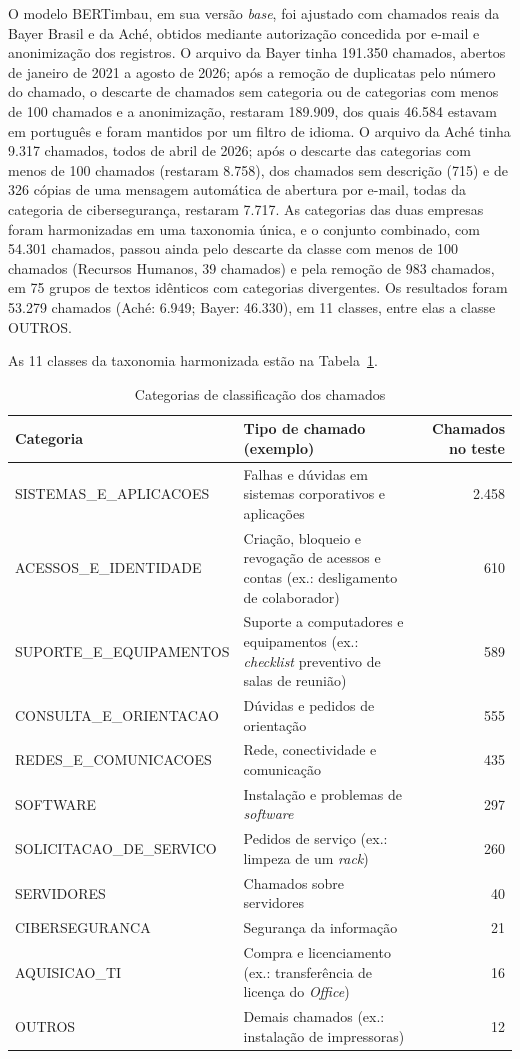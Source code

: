 \documentclass[
    12pt,                %
    openright,           %
    oneside,             %
    a4paper,             %
    english,             %
    brazil               %
]{abntex2}
\let\legendoriginal\legend
\renewcommand{\legend}[1]{\legendoriginal{\small #1}}
\begin{document}
O modelo BERTimbau, em sua versão \textit{base}, foi ajustado com chamados reais da Bayer Brasil e da Aché, obtidos mediante autorização concedida por e-mail e anonimização dos registros. O arquivo da Bayer tinha 191.350 chamados, abertos de janeiro de 2021 a agosto de 2026; após a remoção de duplicatas pelo número do chamado, o descarte de chamados sem categoria ou de categorias com menos de 100 chamados e a anonimização, restaram 189.909, dos quais 46.584 estavam em português e foram mantidos por um filtro de idioma. O arquivo da Aché tinha 9.317 chamados, todos de abril de 2026; após o descarte das categorias com menos de 100 chamados (restaram 8.758), dos chamados sem descrição (715) e de 326 cópias de uma mensagem automática de abertura por e-mail, todas da categoria de cibersegurança, restaram 7.717. As categorias das duas empresas foram harmonizadas em uma taxonomia única, e o conjunto combinado, com 54.301 chamados, passou ainda pelo descarte da classe com menos de 100 chamados (Recursos Humanos, 39 chamados) e pela remoção de 983 chamados, em 75 grupos de textos idênticos com categorias divergentes. Os resultados foram 53.279 chamados (Aché: 6.949; Bayer: 46.330), em 11 classes, entre elas a classe OUTROS.

As 11 classes da taxonomia harmonizada estão na Tabela~\ref{tab:categorias}.

\begin{table}[htb]
  \centering
  \caption{Categorias de classificação dos chamados}
  \label{tab:categorias}
  \footnotesize
  \setlength{\tabcolsep}{4pt}
  \begin{tabular}{p{5.5cm}p{6.2cm}r}
    \toprule
    Categoria & Tipo de chamado (exemplo) & Chamados no teste \\
    \midrule
    SISTEMAS\_E\_APLICACOES & Falhas e dúvidas em sistemas corporativos e aplicações & 2.458 \\
    ACESSOS\_E\_IDENTIDADE & Criação, bloqueio e revogação de acessos e contas (ex.: desligamento de colaborador) & 610 \\
    SUPORTE\_E\_EQUIPAMENTOS & Suporte a computadores e equipamentos (ex.: \textit{checklist} preventivo de salas de reunião) & 589 \\
    CONSULTA\_E\_ORIENTACAO & Dúvidas e pedidos de orientação & 555 \\
    REDES\_E\_COMUNICACOES & Rede, conectividade e comunicação & 435 \\
    SOFTWARE & Instalação e problemas de \textit{software} & 297 \\
    SOLICITACAO\_DE\_SERVICO & Pedidos de serviço (ex.: limpeza de um \textit{rack}) & 260 \\
    SERVIDORES & Chamados sobre servidores & 40 \\
    CIBERSEGURANCA & Segurança da informação & 21 \\
    AQUISICAO\_TI & Compra e licenciamento (ex.: transferência de licença do \textit{Office}) & 16 \\
    OUTROS & Demais chamados (ex.: instalação de impressoras) & 12 \\
    \bottomrule
  \end{tabular}
  \legend{Fonte: Elaborado pelos autores}
\end{table}
\end{document}
